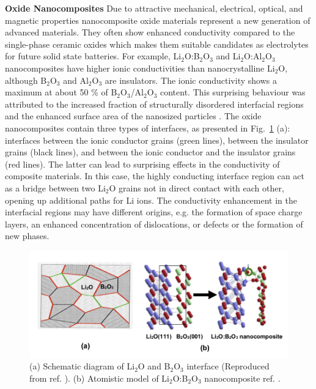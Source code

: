 \documentclass[../main.tex]{subfiles}
\begin{document}
\textbf{Oxide Nanocomposites} Due to attractive mechanical, electrical, optical, and magnetic properties nanocomposite oxide materials represent a new generation of advanced materials. \cite{uvarov2011,Heitjans_2003} They often show enhanced conductivity compared to the single-phase ceramic oxides which makes them suitable candidates as electrolytes for future solid state batteries. For example, Li$_2$O:B$_2$O$_3$ \cite{Heitjans_2003,Indris2000,Indris2002} and Li$_2$O:Al$_2$O$_3$ nanocomposites \cite{B300908D} have higher ionic conductivities than nanocrystalline Li$_2$O, although B$_2$O$_3$ and Al$_2$O$_3$ are insulators. The ionic conductivity shows a maximum at about 50 \% of B$_2$O$_3$/Al$_2$O$_3$ content. This surprising behaviour was attributed to the increased fraction of structurally disordered interfacial regions and the enhanced surface area of the nanosized particles \cite{Heitjans_2003}. The oxide nanocomposites contain three types of interfaces, as presented in Fig.~\ref{fig:LBO} (a): interfaces between the ionic conductor grains (green lines), between the insulator grains (black lines), and between the ionic conductor and the insulator grains (red lines). The latter can lead to surprising effects in the conductivity of composite materials. In this case, the highly conducting interface region can act as a bridge between two Li$_2$O grains not in direct contact with each other, opening up additional paths for Li ions. The conductivity enhancement in the interfacial regions may have different origins, e.g. the formation of space charge layers, an enhanced concentration of dislocations, or defects or the formation of new phases.

\begin{figure}
    \centering
    \includegraphics[scale=1]{figures/Islam-Fig-Li2O-B2O3.png}
    \caption{(a) Schematic diagram of Li$_2$O and B$_2$O$_3$ interface (Reproduced from ref. ). (b) Atomistic model of Li$_2$O:B$_2$O$_3$ nanocomposite ref. .}
    \label{fig:LBO}
\end{figure}
\end{document}
